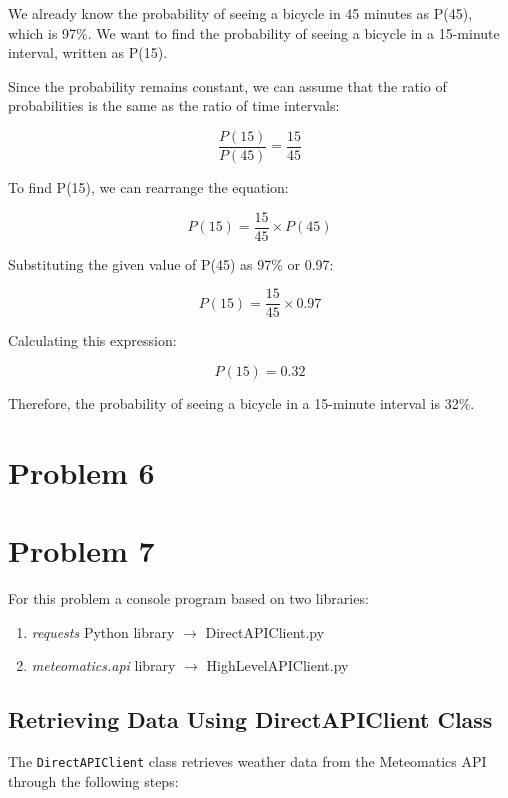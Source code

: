 	We already know the probability of seeing a bicycle in 45 minutes as P(45), which is 97\%. We want to find the probability of seeing a bicycle in a 15-minute interval, written as P(15).
	
	Since the probability remains constant, we can assume that the ratio of probabilities is the same as the ratio of time intervals:
	
	\[
	\frac{{P(15)}}{{P(45)}} = \frac{{15}}{{45}}\]
	
	To find P(15), we can rearrange the equation:
	
	\[P(15) = \frac{{15}}{{45}} \times P(45)\]
	
	Substituting the given value of P(45) as 97\% or 0.97:
	
	\[P(15) = \frac{{15}}{{45}} \times 0.97\]
	
	Calculating this expression:
	
	\[P(15) = 0.32\]
	
	Therefore, the probability of seeing a bicycle in a 15-minute interval is 32\%.

	\newpage
	\section*{Problem 6}\label{sec:prob-6}


	\newpage
	\section*{Problem 7}\label{sec:prob-7}
	For this problem a console program based on two libraries:
	\begin{enumerate}
	\item 	\textit{requests} Python library $ \rightarrow $ DirectAPIClient.py
	\item 	\textit{meteomatics.api} library $ \rightarrow $ HighLevelAPIClient.py
	\end{enumerate}
	
	\subsection*{Retrieving Data Using DirectAPIClient Class}
	The \texttt{DirectAPIClient} class retrieves weather data from the Meteomatics API through the following steps:
	
